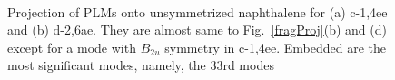 \begin{figure}[!h]
\\
\caption{Projection of PLMs onto unsymmetrized naphthalene for (a) c-1,4ee and (b) d-2,6ae.
They are almost same to Fig.~\ref{fragProj}(b) and (d) except for a mode with $B_{2u}$ symmetry in c-1,4ee.
Embedded are the most significant modes, namely, the 33rd modes \label{projNaph}}
\end{figure}


